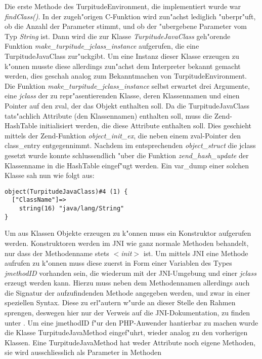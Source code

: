 Die erste Methode des TurpitudeEnvironment, die implementiert wurde war \emph{findClass()}. In der zugeh"origen C-Funktion wird zun"achst 
lediglich "uberpr"uft, ob die Anzahl der Parameter stimmt, und ob der "ubergebene Parameter vom Typ \emph{String} ist. Dann wird die
zur Klasse \emph{TurpitudeJavaClass} geh"orende Funktion \emph{make\_turpitude\_jclass\_instance} aufgerufen, die eine TurpitudeJavaClass
zur"uckgibt. Um eine Instanz dieser
Klasse erzeugen zu k"onnen musste diese allerdings zun"achst dem Interpreter bekannt gemacht werden, dies geschah analog zum Bekanntmachen
von TurpitudeEnvironment. Die Funktion \emph{make\_turpitude\_jclass\_instance} selbst erwartet drei Argumente, eine \emph{jclass} der zu
repr"asentierenden Klasse, deren Klassennamen und einen Pointer auf den zval, der das Objekt enthalten soll. Da die TurpitudeJavaClass 
tats"achlich Attribute (den Klassennamen) enthalten soll, muss die Zend-HashTable initialisiert werden, die diese Attribute enthalten soll.
Dies geschieht mittels der Zend-Funktion \emph{object\_init\_ex}, die neben einem zval-Pointer den class\_entry entgegennimmt.
Nachdem im entsprechenden \emph{object\_struct} die jclass gesetzt wurde konnte schlussendlich "uber die Funktion \emph{zend\_hash\_update} 
der Klassenname in die HashTable eingef"ugt werden. Ein var\_dump einer solchen Klasse sah nun wie folgt aus:
\begin{lstlisting}[caption=Dump einer TurpitudeJavaClass]
object(TurpitudeJavaClass)#4 (1) {
  ["ClassName"]=>
    string(16) "java/lang/String"
}
\end{lstlisting}
Um aus Klassen Objekte erzeugen zu k"onnen muss ein Konstruktor aufgerufen werden. Konstruktoren werden im JNI wie ganz normale Methoden
behandelt, nur dass der Methodenname stets \emph{$<$init$>$} ist. Um mittels JNI eine Methode aufrufen zu k"onnen muss diese zuerst in
Form einer Variablen des Types \emph{jmethodID} vorhanden sein, die wiederum mit der JNI-Umgebung und einer \emph{jclass} erzeugt werden kann.
Hierzu muss neben dem Methodennamen allerdings auch die Signatur der aufzufindenden Methode angegeben werden, und zwar in einer speziellen
Syntax. Diese zu erl"autern w"urde an dieser Stelle den Rahmen sprengen, deswegen hier nur der Verweis auf die JNI-Dokumentation, zu finden
unter \cite{JNIHP}.
Um eine jmethodID f"ur den PHP-Anwender hantierbar zu machen wurde die Klasse TurpitudeJavaMethod eingef"uhrt, wieder analog zu den
vorherigen Klassen. Eine TurpitudeJavaMethod hat weder Attribute noch eigene Methoden, sie wird ausschliesslich als Parameter in Methoden
